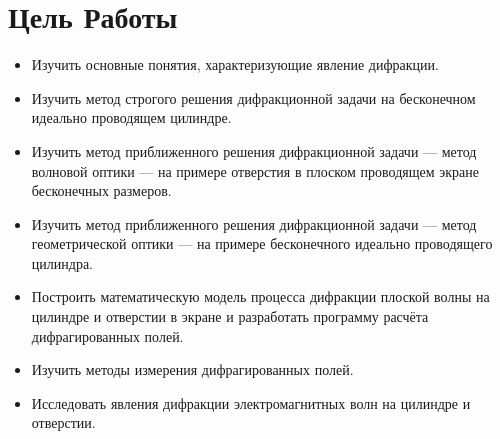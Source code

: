 \documentclass[12pt,a4paper,oneside, reqno]{amsart}
\begin{document}
\tableofcontents
\newpage
\section{Цель Работы}
\begin{itemize}
    \item Изучить основные понятия, характеризующие явление дифракции.\\
    \item Изучить метод строгого решения дифракционной задачи на бесконечном идеально проводящем цилиндре.\\
    \item Изучить метод приближенного решения дифракционной задачи --- метод волновой оптики --- на примере
          отверстия в плоском проводящем экране бесконечных размеров.\\
    \item Изучить метод приближенного решения дифракционной задачи --- метод геометрической оптики --- на 
          примере бесконечного идеально проводящего цилиндра.\\
    \item Построить математическую модель процесса дифракции плоской волны на цилиндре и отверстии в экране
          и разработать программу расчёта дифрагированных полей.\\
    \item Изучить методы измерения дифрагированных полей.\\
    \item Исследовать явления дифракции электромагнитных волн на цилиндре и отверстии.
\end{itemize}

\newpage
\end{document}
